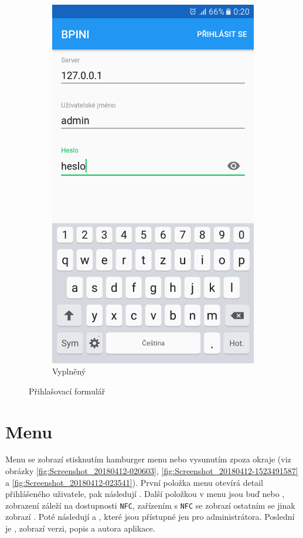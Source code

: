 \documentclass[12pt]{report}
\begin{document}
\begin{figure}[H]
\begin{subfigure}[b]{0.3\textwidth}
	\includegraphics[width=\textwidth]{../images/client_android/Screenshot_20170612-002041.png}	
	\caption{Vyplněný}
	\label{fig:Screenshot_20170612-002041}
  \end{subfigure}
  \caption{Přihlašovací formulář}
\end{figure}


\section{Menu}
Menu se zobrazí stisknutím hamburger menu nebo vysunutím zpoza okraje (viz obrázky \ref{fig:Screenshot_20180412-020603}, \ref{fig:Screenshot_20180412-1523491587} a \ref{fig:Screenshot_20180412-023541}).
První položka menu otevírá detail přihlášeného uživatele, pak následují . 
Další položkou v menu jsou buď  nebo , zobrazení záleží na dostupnosti \texttt{NFC}, zařízením s \texttt{NFC} se zobrazí  ostatním se jinak zobrazí .
Poté následují  a , které jsou přístupné jen pro administrátora.
Poslední je , zobrazí verzi, popis a autora aplikace.
\end{document}
